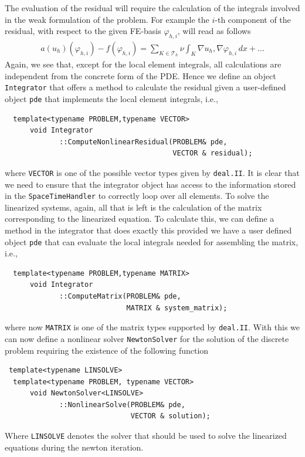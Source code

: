 \documentclass[prodmode,acmtoms]{acmsmall}
\numberwithin{equation}{section}
\renewcommand{\phi}{\varphi}
\newcommand{\deal}{\texttt{deal.II}}
\begin{document}
The evaluation of the residual will require the calculation of the integrals 
involved in the weak formulation of the problem. For example 
the $i$-th component of the residual, with respect to the given FE-basis 
$\phi_{h,i}$, will read as follows
\begin{align}\label{eq:residual_vector}
 a(u_h)(\phi_{h,i}) - f(\phi_{h,i}) = \sum_{K\in \mathcal T_h} \nu\int_K \nabla u_h, \nabla \phi_{h,i}\,dx + \ldots
 \end{align}
Again, we see that, except for the local element integrals, all 
calculations are independent from the concrete form of the PDE. 
Hence we define an object \texttt{Integrator}
that offers a method to calculate the residual given a user-defined 
object \texttt{pde} that implements the local element integrals, i.e.,
\begin{lstlisting}
  template<typename PROBLEM,typename VECTOR>
      void Integrator
             ::ComputeNonlinearResidual(PROBLEM& pde, 
                                        VECTOR & residual);
\end{lstlisting}
where \texttt{VECTOR} is one of the possible vector types given by \deal{}.
It is clear that we need to ensure that the integrator object has access
to the information stored in the \texttt{SpaceTimeHandler}
to correctly loop over all elements.
To solve the linearized systems, again, all that is left is the calculation
of the matrix corresponding to the linearized equation. To calculate this,
 we can define a method in the integrator that does exactly this provided
we have a user defined object \texttt{pde} that can evaluate the local 
integrals needed for assembling the matrix, i.e.,
\begin{lstlisting}
  template<typename PROBLEM,typename MATRIX>
      void Integrator
             ::ComputeMatrix(PROBLEM& pde, 
                             MATRIX & system_matrix);
\end{lstlisting}
where now \texttt{MATRIX} is one of the matrix types supported by \deal{}.
With this we can now define a nonlinear solver \texttt{NewtonSolver} 
for the solution of the discrete problem requiring the existence of the 
following function
\begin{lstlisting}
 template<typename LINSOLVE>
  template<typename PROBLEM, typename VECTOR>
      void NewtonSolver<LINSOLVE>
             ::NonlinearSolve(PROBLEM& pde, 
                              VECTOR & solution);
\end{lstlisting}
Where \texttt{LINSOLVE} denotes the solver that should be used to solve the 
linearized equations during the newton iteration.
\end{document}
